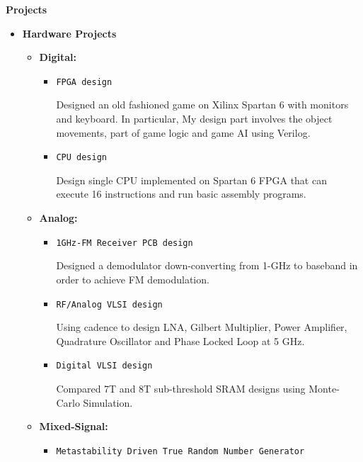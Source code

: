 \documentclass[]{article}
\begin{document}
\noindent \textbf{Projects}
\begin{itemize}
    \item \textbf{Hardware Projects}
    \begin{itemize}
        \item \textbf{Digital:} 
        \begin{itemize}

            \item \verb+FPGA design+

            Designed an old fashioned game on Xilinx Spartan 6 with monitors and keyboard.  In particular,
            My design part involves the object movements, part of game logic and game AI using Verilog.


            \item \verb+CPU design+

            Design single CPU implemented on Spartan 6 FPGA that can execute 16 instructions and run
            basic assembly programs.

        \end{itemize}

        \item \textbf{Analog:} 

        \begin{itemize}

            \item \verb+1GHz-FM Receiver PCB design+

            Designed a demodulator down-converting from 1-GHz to baseband in order to achieve FM
            demodulation.

            \item \verb+RF/Analog VLSI design+ 

            Using cadence to design LNA, Gilbert Multiplier, Power Amplifier, Quadrature Oscillator and
            Phase Locked Loop at 5 GHz.

            \item \verb+Digital VLSI design+

            Compared 7T and 8T sub-threshold SRAM designs using Monte-Carlo Simulation.

        \end{itemize}

        \item \textbf{Mixed-Signal:}

        \begin{itemize}
            \item \verb+Metastability Driven True Random Number Generator+


\end{itemize}
\end{itemize}
\end{itemize}
\end{document}

